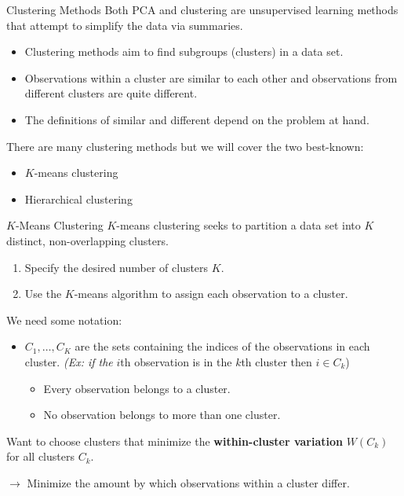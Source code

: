 \documentclass[
  ignorenonframetext,
  aspectratio=169,
]{beamer}
\begin{document}
\begin{frame}{Clustering Methods}
\protect\hypertarget{clustering-methods}{}
Both PCA and clustering are unsupervised learning methods that attempt
to simplify the data via summaries.

\begin{itemize}
\item
  \alert{Clustering methods aim to find subgroups (clusters) in a data set.}
\item
  Observations within a cluster are similar to each other and
  observations from different clusters are quite different.
\item
  The definitions of similar and different depend on the problem at
  hand.
\end{itemize}

There are many clustering methods but we will cover the two best-known:

\begin{itemize}
\item
  \(K\)-means clustering
\item
  Hierarchical clustering
\end{itemize}
\end{frame}

\begin{frame}{\(K\)-Means Clustering}
\protect\hypertarget{k-means-clustering}{}
\alert{$K$-means clustering seeks to partition a data set into $K$ distinct, non-overlapping clusters.}

\begin{enumerate}
\item
  Specify the desired number of clusters \(K\).
\item
  Use the \(K\)-means algorithm to assign each observation to a cluster.
\end{enumerate}

We need some notation:

\begin{itemize}
\item
  \(C_1, \dots, C_K\) are the sets containing the indices of the
  observations in each cluster. \emph{(Ex: if the} \(i\)th observation
  is in the \(k\)th cluster then \(i \in C_k\))

  \begin{itemize}
  \item
    Every observation belongs to a cluster.
  \item
    No observation belongs to more than one cluster.
  \end{itemize}
\end{itemize}

Want to
\alert{choose clusters that minimize the \textbf{within-cluster variation}}
\(W(C_k)\) for all clusters \(C_k\).

\(\rightarrow\) Minimize the amount by which observations within a
cluster differ.
\end{frame}
\end{document}
